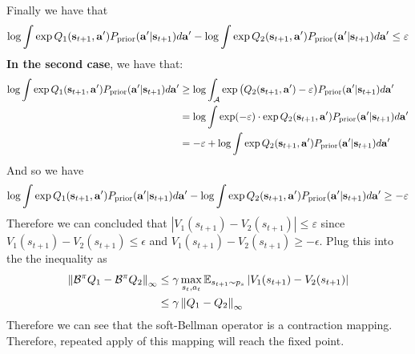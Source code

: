 Finally we have that 
\begin{equation*}
    \log \int \exp Q_1(\bold{s}_{t+1}, \bold{a}') P_{\text{prior}} (\bold{a}' | \bold{s}_{t+1}) d\bold{a}' - \log \int \exp Q_2(\bold{s}_{t+1}, \bold{a}')P_{\text{prior}} (\bold{a}' | \bold{s}_{t+1}) d\bold{a}' \le \varepsilon
\end{equation*}
\textbf{In the second case}, we have that:
\begin{equation*}
    \begin{aligned}
        \log \int \exp Q_1(\bold{s}_{t+1}, \bold{a}') P_{\text{prior}} (\bold{a}' | \bold{s}_{t+1}) d\bold{a}' &\ge \log \int_{\mathcal{A}} \exp \big(Q_2(\bold{s}_{t+1}, \bold{a}') - \varepsilon \big) P_{\text{prior}} (\bold{a}' | \bold{s}_{t+1}) d\bold{a}' \\ 
        &= \log \int \exp (-\varepsilon) \cdot \exp Q_2(\bold{s}_{t+1}, \bold{a}') P_{\text{prior}} (\bold{a}' | \bold{s}_{t+1}) d\bold{a}' \\ 
        &= -\varepsilon + \log \int \exp Q_2(\bold{s}_{t+1}, \bold{a}')P_{\text{prior}} (\bold{a}' | \bold{s}_{t+1}) d\bold{a}'
    \end{aligned}
\end{equation*}
And so we have
\begin{equation*}
    \log \int \exp Q_1(\bold{s}_{t+1}, \bold{a}') P_{\text{prior}} (\bold{a}' | \bold{s}_{t+1}) d\bold{a}' - \log \int \exp Q_2(\bold{s}_{t+1}, \bold{a}')P_{\text{prior}} (\bold{a}' | \bold{s}_{t+1}) d\bold{a}' \ge -\varepsilon
\end{equation*}
Therefore we can concluded that $\left| V_1(s_{t+1})- V_2(s_{t+1}) \right| \le \varepsilon$ since $V_1(s_{t+1}) - V_2(s_{t+1}) \le \epsilon$ and $V_1(s_{t+1}) - V_2(s_{t+1}) \ge -\epsilon$. Plug this into the the inequality as 
\begin{equation*}
    \begin{aligned}
        \left\lVert\mathcal{B}^{\pi} Q_1 - \mathcal{B}^{\pi} Q_2\right\rVert_{\infty} &\le \gamma \max_{s_t, a_t}\mathbb{E}_{s_{t+1} \sim p_{s}} \left| V_1(s_{t+1})- V_2(s_{t+1}) \right| \\
        &\le \gamma \left\lVert Q_1 - Q_2\right\rVert_{\infty}
    \end{aligned}
\end{equation*}
Therefore we can see that the soft-Bellman operator is a contraction mapping. Therefore, repeated apply of this mapping will reach the fixed point.

